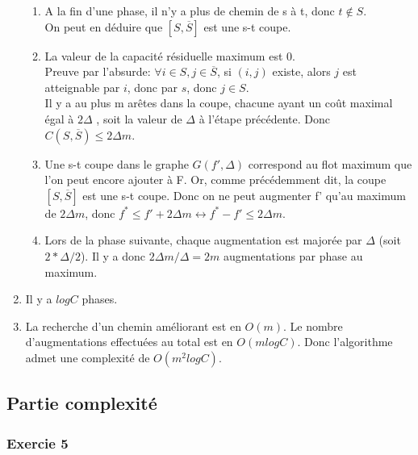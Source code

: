 \documentclass[]{article}
\begin{document}
\begin{enumerate}
\begin{enumerate}
\item A la fin d'une phase, il n'y a plus de chemin de s à t, donc $t\notin S$.\\
On peut en déduire que $[S,\overline{S}]$ est une s-t coupe.
\vspace*{7mm}
\item La valeur de la capacité résiduelle maximum est 0.\\
Preuve par l'absurde: $\forall i\in S,j \in \overline{S}$, si $(i,j)$ existe, alors $j$ est atteignable par $i$, donc par $s$, donc $j\in S$.\\
Il y a au plus m arêtes dans la coupe, chacune ayant un coût maximal égal à $2\Delta$ , soit la valeur de $\Delta$ à l'étape précédente. Donc $C(S,\overline{S})\le 2\Delta m$.
\vspace*{7mm}
\item Une s-t coupe dans le graphe $G(f',\Delta)$ correspond au flot maximum que l'on peut encore ajouter à F. Or, comme précédemment dit, la coupe $[S,\overline{S}]$ est une s-t coupe. Donc on ne peut augmenter f' qu'au maximum de $2 \Delta m$, donc $f^*\le f'+2 \Delta m \leftrightarrow f^* - f' \le 2 \Delta m$.
\vspace*{7mm}
\item Lors de la phase suivante, chaque augmentation est majorée par $\Delta$ (soit $2*\Delta /2$). Il y a donc $2\Delta m / \Delta = 2m$ augmentations par phase au maximum.\\
\end{enumerate}
\vspace*{7mm}
\item Il y a $log C$ phases.\\

\item La recherche d'un chemin améliorant est en $O(m)$. Le nombre d'augmentations effectuées au total est en $O(m log C)$. Donc l'algorithme admet une complexité de $O(m^2log C)$.\\
\end{enumerate}

\subsection{Partie complexité}

\subsubsection{Exercie 5}
\end{document}
